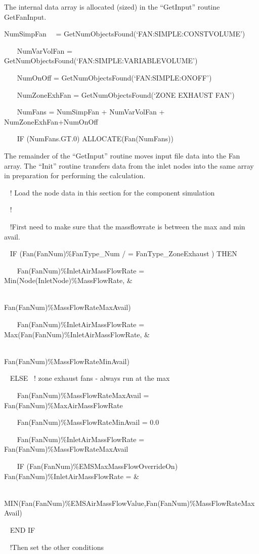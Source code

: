 The internal data array is allocated (sized) in the ``GetInput'' routine GetFanInput.

NumSimpFan~~ = GetNumObjectsFound(`FAN:SIMPLE:CONSTVOLUME')

~~~ NumVarVolFan = GetNumObjectsFound(`FAN:SIMPLE:VARIABLEVOLUME')

~~~ NumOnOff = GetNumObjectsFound(`FAN:SIMPLE:ONOFF')

~~~ NumZoneExhFan = GetNumObjectsFound(`ZONE EXHAUST FAN')

~~~ NumFans = NumSimpFan + NumVarVolFan + NumZoneExhFan+NumOnOff

~~~ IF (NumFans.GT.0) ALLOCATE(Fan(NumFans))

The remainder of the ``GetInput'' routine moves input file data into the Fan array. The ``Init'' routine transfers data from the inlet nodes into the same array in preparation for performing the calculation.

~ ! Load the node data in this section for the component simulation

~ !

~ !First need to make sure that the massflowrate is between the max and min avail.

~ IF (Fan(FanNum)\%FanType\_Num / = FanType\_ZoneExhaust ) THEN

~~~ Fan(FanNum)\%InletAirMassFlowRate = Min(Node(InletNode)\%MassFlowRate, \&

~~~~~~~~~~~~~~~~~~~~~~~~~~~~~~~~~~~~~~~~~~ Fan(FanNum)\%MassFlowRateMaxAvail)

~~~ Fan(FanNum)\%InletAirMassFlowRate = Max(Fan(FanNum)\%InletAirMassFlowRate, \&

~~~~~~~~~~~~~~~~~~~~~~~~~~~~~~~~~~~~~~~~~~ Fan(FanNum)\%MassFlowRateMinAvail)

~ ELSE~ ! zone exhaust fans - always run at the max

~~~ Fan(FanNum)\%MassFlowRateMaxAvail = Fan(FanNum)\%MaxAirMassFlowRate

~~~ Fan(FanNum)\%MassFlowRateMinAvail = 0.0

~~~ Fan(FanNum)\%InletAirMassFlowRate = Fan(FanNum)\%MassFlowRateMaxAvail

~~~ IF (Fan(FanNum)\%EMSMaxMassFlowOverrideOn) Fan(FanNum)\%InletAirMassFlowRate = \&

~~~~~~ MIN(Fan(FanNum)\%EMSAirMassFlowValue,Fan(FanNum)\%MassFlowRateMaxAvail)

~ END IF

~ !Then set the other conditions

